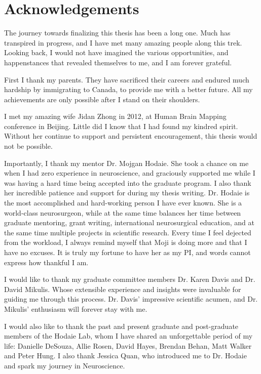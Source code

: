 \chapter{Acknowledgements}

The journey towards finalizing this thesis has been a long one. Much has transpired in progress, and I have met many amazing people along this trek. Looking back, I would not have imagined the various opportunities, and happenstances that revealed themselves to me, and I am forever grateful. 

First I thank my parents. They have sacrificed their careers and endured much hardship by immigrating to Canada, to provide me with a better future. All my achievements are only possible after I stand on their shoulders. 

I met my amazing wife Jidan Zhong in 2012, at Human Brain Mapping conference in Beijing. Little did I know that I had found my kindred spirit. Without her continue to support and persistent encouragement, this thesis would not be possible. 

Importantly, I thank my mentor Dr. Mojgan Hodaie. She took a chance on me when I had zero experience in neuroscience, and graciously supported me while I was having a hard time being accepted into the graduate program. I also thank her incredible patience and support for during my thesis writing. Dr. Hodaie is the most accomplished and hard-working person I have ever known. She is a world-class neurosurgeon, while at the same time balances her time between graduate mentoring, grant writing, international neurosurgical education, and at the same time multiple projects in scientific research. Every time I feel dejected from the workload, I always remind myself that Moji is doing more and that I have no excuses. It is truly my fortune to have her as my PI, and words cannot express how thankful I am. 

I would like to thank my graduate committee members Dr. Karen Davis and Dr. David Mikulis. Whose extensible experience and insights were invaluable for guiding me through this process. Dr. Davis' impressive scientific acumen, and Dr. Mikulis' enthusiasm will forever stay with me. 

I would also like to thank the past and present graduate and post-graduate members of the Hodaie Lab, whom I have shared an unforgettable period of my life: Danielle DeSouza, Allie Rosen, David Hayes, Brendan Behan, Matt Walker and Peter Hung. I also thank Jessica Quan, who introduced me to Dr. Hodaie and spark my journey in Neuroscience. 

